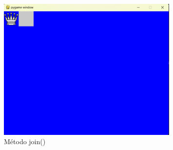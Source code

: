 \documentclass{article}
\begin{document}
\begin{itemize}
\begin{figure}[H]
      \includegraphics[width=0.8\textwidth, keepaspectratio]{img/join.png}
      \caption{Método join()}
    \end{figure}
  \end{itemize}
  
\end{document}
